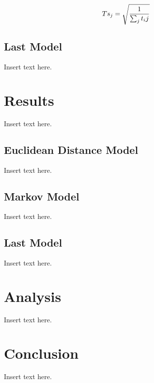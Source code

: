 \documentclass[twoside,twocolumn]{article}
\begin{document}
\begin{equation}
\begin{aligned}
Ts_j = \sqrt{1\over{\sum_j{t_ij}}}
\end{aligned}
\end{equation}


\subsection{Last Model} %
Insert text here.

\section{Results}
\label{sec:res}
Insert text here.

\subsection{Euclidean Distance Model}
Insert text here.

\subsection{Markov Model}
Insert text here.

\subsection{Last Model}
Insert text here.

\section{Analysis}
\label{sec:analysis}
Insert text here.

\section{Conclusion}
\label{sec:conclusion}
Insert text here.

\end{document}
